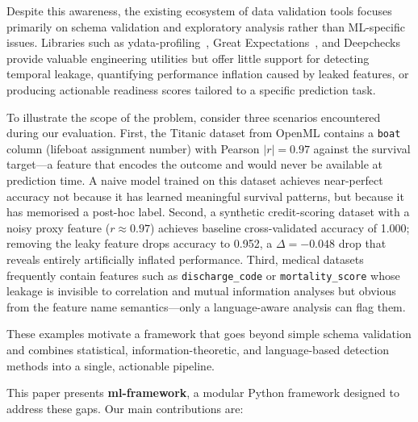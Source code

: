 \documentclass[11pt]{article}
\begin{document}
Despite this awareness, the existing ecosystem of data validation tools
focuses primarily on schema validation and exploratory analysis rather than
ML-specific issues.  Libraries such as ydata-profiling~\cite{ydataprofiling},
Great Expectations~\cite{greatexpectations}, and Deepchecks~\cite{deepchecks}
provide valuable engineering utilities but offer little support for detecting
temporal leakage, quantifying performance inflation caused by leaked features,
or producing actionable readiness scores tailored to a specific prediction task.

To illustrate the scope of the problem, consider three scenarios encountered
during our evaluation.  First, the Titanic dataset from OpenML contains a
\texttt{boat} column (lifeboat assignment number) with Pearson $|r| = 0.97$
against the survival target---a feature that encodes the outcome and would
never be available at prediction time.  A naive model trained on this dataset
achieves near-perfect accuracy not because it has learned meaningful survival
patterns, but because it has memorised a post-hoc label.  Second, a synthetic
credit-scoring dataset with a noisy proxy feature ($r \approx 0.97$) achieves
baseline cross-validated accuracy of 1.000; removing the leaky feature drops
accuracy to 0.952, a $\Delta = -0.048$ drop that reveals entirely
artificially inflated performance.  Third, medical datasets frequently contain
features such as \texttt{discharge\_code} or \texttt{mortality\_score} whose
leakage is invisible to correlation and mutual information analyses but
obvious from the feature name semantics---only a language-aware analysis can
flag them.

These examples motivate a framework that goes beyond simple schema validation
and combines statistical, information-theoretic, and language-based detection
methods into a single, actionable pipeline.

This paper presents \textbf{ml-framework}, a modular Python framework designed
to address these gaps.  Our main contributions are:
\end{document}
